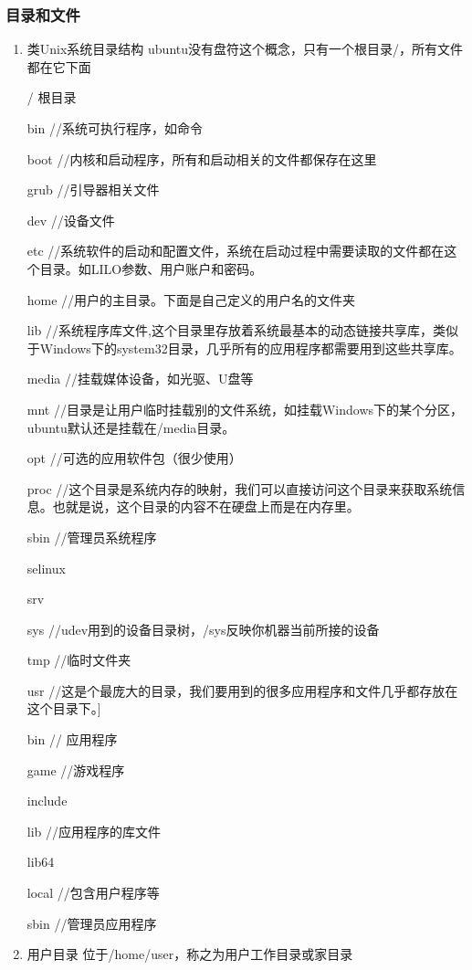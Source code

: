 \documentclass[11pt]{article}
\begin{document}
\subsubsection{目录和文件}
\label{sec-1-1-2}
\begin{enumerate}
\item 类Unix系统目录结构
\label{sec-1-1-2-1}
ubuntu没有盘符这个概念，只有一个根目录/，所有文件都在它下面

/    根目录

bin       //系统可执行程序，如命令

boot     //内核和启动程序，所有和启动相关的文件都保存在这里

grub    //引导器相关文件

dev      //设备文件

etc      //系统软件的启动和配置文件，系统在启动过程中需要读取的文件都在这个目录。如LILO参数、用户账户和密码。

home   //用户的主目录。下面是自己定义的用户名的文件夹

lib       //系统程序库文件,这个目录里存放着系统最基本的动态链接共享库，类似于Windows下的system32目录，几乎所有的应用程序都需要用到这些共享库。

media  //挂载媒体设备，如光驱、U盘等

mnt    //目录是让用户临时挂载别的文件系统，如挂载Windows下的某个分区，ubuntu默认还是挂载在/media目录。

opt     //可选的应用软件包（很少使用）

proc     //这个目录是系统内存的映射，我们可以直接访问这个目录来获取系统信息。也就是说，这个目录的内容不在硬盘上而是在内存里。

sbin    //管理员系统程序

selinux

srv

sys   //udev用到的设备目录树，/sys反映你机器当前所接的设备

tmp  //临时文件夹

usr   //这是个最庞大的目录，我们要用到的很多应用程序和文件几乎都存放在这个目录下。]

bin   // 应用程序

game  //游戏程序

include

lib    //应用程序的库文件

lib64

local   //包含用户程序等

sbin    //管理员应用程序
\item 用户目录
\label{sec-1-1-2-2}
位于/home/user，称之为用户工作目录或家目录


\end{enumerate}
\end{document}
